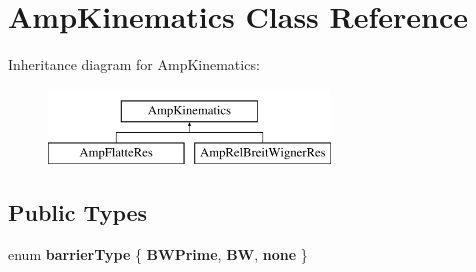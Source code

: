 \hypertarget{class_amp_kinematics}{\section{Amp\-Kinematics Class Reference}
\label{class_amp_kinematics}
}
Inheritance diagram for Amp\-Kinematics\-:\begin{figure}[H]
\begin{center}
\leavevmode
\includegraphics[height=2.000000cm]{class_amp_kinematics}
\end{center}
\end{figure}
\subsection*{Public Types}
\begin{DoxyCompactItemize}
\item 
enum {\bfseries barrier\-Type} \{ {\bfseries B\-W\-Prime}, 
{\bfseries B\-W}, 
{\bfseries none}
 \}
\end{DoxyCompactItemize}
